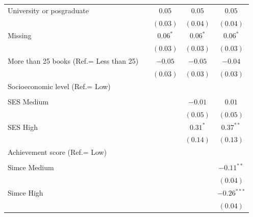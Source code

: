 \documentclass[
  12pt,
  letterpaper,
]{article}
\begin{document}
\begin{table}
{\begin{center}
{\begin{threeparttable}
\begin{tabular}{l c c c c}
\quad University or posgraduate           &               & $0.05$        & $0.05$        & $0.05$        \\
                                          &               & $(0.03)$      & $(0.04)$      & $(0.04)$      \\
\quad Missing                             &               & $0.06^{*}$    & $0.06^{*}$    & $0.06^{*}$    \\
                                          &               & $(0.03)$      & $(0.03)$      & $(0.03)$      \\
More than 25 books (Ref.= Less than 25)   &               & $-0.05$       & $-0.05$       & $-0.04$       \\
                                          &               & $(0.03)$      & $(0.03)$      & $(0.03)$      \\
Socioeconomic level (Ref.= Low)           &               &               &               &               \\
                                          &               &               &               &               \\
\quad SES Medium                          &               &               & $-0.01$       & $0.01$        \\
                                          &               &               & $(0.05)$      & $(0.05)$      \\
\quad SES High                            &               &               & $0.31^{*}$    & $0.37^{**}$   \\
                                          &               &               & $(0.14)$      & $(0.13)$      \\
Achievement score (Ref.= Low)             &               &               &               &               \\
                                          &               &               &               &               \\
\quad Simce Medium                        &               &               &               & $-0.11^{**}$  \\
                                          &               &               &               & $(0.04)$      \\
\quad Simce High                          &               &               &               & $-0.26^{***}$ \\
                                          &               &               &               & $(0.04)$      \\

\end{tabular}
\end{threeparttable}}
\end{center}}
\end{table}
\end{document}
